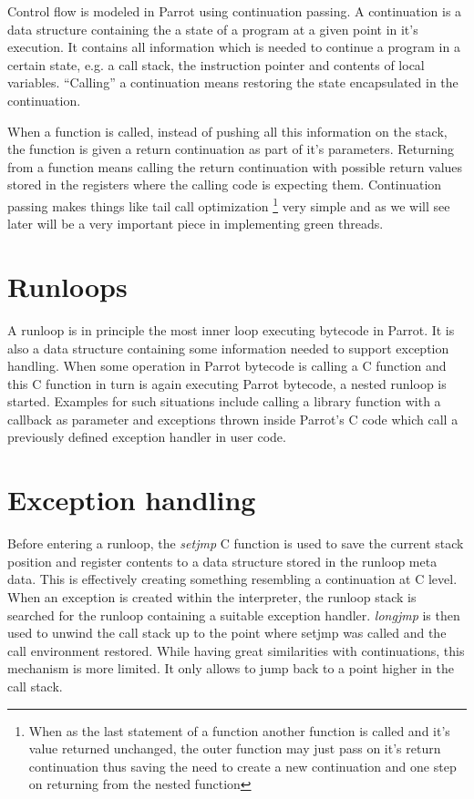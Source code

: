 \documentclass[bachelor,english]{hgbthesis}
\begin{document}
Control flow is modeled in Parrot using continuation passing. A continuation is a data structure containing the a state of a program at a given point in it's execution. It contains all information which is needed to continue a program in a certain state, e.g. a call stack, the instruction pointer and contents of local variables. ``Calling'' a continuation means restoring the state encapsulated in the continuation.

When a function is called, instead of pushing all this information on the stack, the function is given a return continuation as part of it's parameters. Returning from a function means calling the return continuation with possible return values stored in the registers where the calling code is expecting them. Continuation passing makes things like tail call optimization \footnote{When as the last statement of a function another function is called and it's value returned unchanged, the outer function may just pass on it's return continuation thus saving the need to create a new continuation and one step on returning from the nested function} very simple and as we will see later will be a very important piece in implementing green threads.

\section{Runloops}

A runloop is in principle the most inner loop executing bytecode in Parrot. It is also a data structure containing some information needed to support exception handling. When some operation in Parrot bytecode is calling a C function and this C function in turn is again executing Parrot bytecode, a nested runloop is started. Examples for such situations include calling a library function with a callback as parameter and exceptions thrown inside Parrot's C code which call a previously defined exception handler in user code.

\section{Exception handling}

Before entering a runloop, the \textit{setjmp} C function is used to save the current stack position and register contents to a data structure stored in the runloop meta data. This is effectively creating something resembling a continuation at C level. When an exception is created within the interpreter, the runloop stack is searched for the runloop containing a suitable exception handler. \textit{longjmp} is then used to unwind the call stack up to the point where setjmp was called and the call environment restored. While having great similarities with continuations, this mechanism is more limited. It only allows to jump back to a point higher in the call stack.
\end{document}
